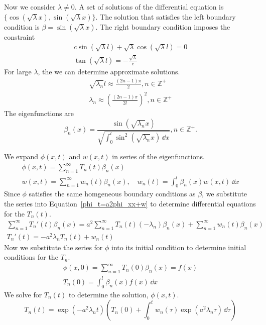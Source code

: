 {\begin{Solution}
  Now we consider $\lambda \neq 0$.  A set of solutions of the
  differential equation is $\{\cos(\sqrt{\lambda} x),
  \sin(\sqrt{\lambda} x) \}$.  The solution that satisfies the left
  boundary condition is $\beta = \sin(\sqrt{\lambda} x)$.  The right
  boundary condition imposes the constraint
  \begin{gather*}
    c \sin \left( \sqrt{\lambda} l \right) + \sqrt{\lambda} 
    \cos \left( \sqrt{\lambda} l \right) = 0 \\
    \tan \left( \sqrt{\lambda} l \right) = - \frac{ \sqrt{\lambda} }{c}
  \end{gather*}
  For large $\lambda$, the we can determine approximate solutions.
  \begin{gather*}
    \sqrt{ \lambda_n } l \approx \frac{ (2n-1) \pi }{ 2 },
    n \in \mathbb{Z}^+ \\
    \lambda_n \approx \left( \frac{ (2n-1) \pi }{ 2 l } \right)^2,
    n \in \mathbb{Z}^+
  \end{gather*}
  The eigenfunctions are
  \[
  \beta_n(x) = \frac{ \sin \left( \sqrt{ \lambda_n } x \right) }
  { \sqrt{ \int_0^l \sin^2 \left( \sqrt{ \lambda_n } x 
      \right) \,\dd x } }, n \in \mathbb{Z}^+.
  \]

  We expand $\phi(x,t)$ and $w(x,t)$ in series of the eigenfunctions.
  \begin{gather*}
    \phi(x,t) = \sum_{n=1}^\infty T_n(t) \beta_n(x) \\
    w(x,t) = \sum_{n=1}^\infty w_n(t) \beta_n(x), \quad
    w_n(t) = \int_0^l \beta_n(x) w(x,t) \,\dd x
  \end{gather*}
  Since $\phi$ satisfies the same homgeneous boundary conditions as
  $\beta$, we substitute the series into Equation~\ref{phi_t=a2phi_xx+w}
  to determine differential equations for the $T_n(t)$.
  \begin{gather*}
    \sum_{n=1}^\infty T_n'(t) \beta_n(x) 
    = a^2 \sum_{n=1}^\infty T_n(t) (-\lambda_n) \beta_n(x)
    + \sum_{n=1}^\infty w_n(t) \beta_n(x) \\
    T_n'(t) = - a^2 \lambda_n T_n(t) + w_n(t)
  \end{gather*}
  Now we substitute the series for $\phi$ into its initial condition to
  determine initial conditions for the $T_n$.
  \begin{gather*}
    \phi(x,0) = \sum_{n=1}^\infty T_n(0) \beta_n(x) = f(x) \\
    T_n(0) = \int_0^l \beta_n(x) f(x) \,\dd x
  \end{gather*}
  We solve for $T_n(t)$ to determine the solution, $\phi(x,t)$.
  \[
  T_n(t) = \exp \left( - a^2 \lambda_n t \right) 
  \left( T_n(0) + \int_0^t w_n(\tau) 
    \exp \left( a^2 \lambda_n \tau \right) \,\dd \tau \right)
  \]
\end{Solution}





}

